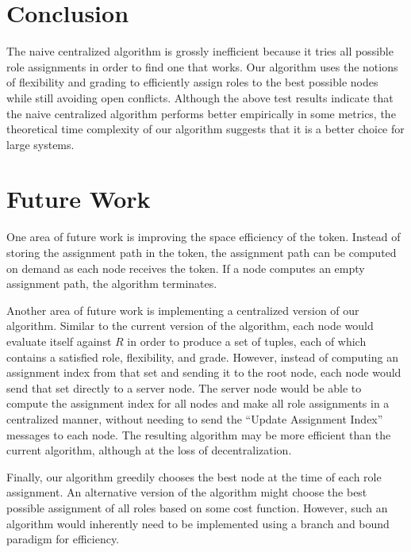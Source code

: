 \documentclass[11pt]{article}
\begin{document}
\begin{multicols}{2}
\section{Conclusion}
The naive centralized algorithm is grossly inefficient because it tries all possible role assignments in order to find one that works. Our algorithm uses the notions of flexibility and grading to efficiently assign roles to the best possible nodes while still avoiding open conflicts. Although the above test results indicate that the naive centralized algorithm performs better empirically in some metrics, the theoretical time complexity of our algorithm suggests that it is a better choice for large systems.

\section{Future Work}
One area of future work is improving the space efficiency of the token. Instead of storing the assignment path in the token, the assignment path can be computed on demand as each node receives the token. If a node computes an empty assignment path, the algorithm terminates.

Another area of future work is implementing a centralized version of our algorithm. Similar to the current version of the algorithm, each node would evaluate itself against $R$ in order to produce a set of tuples, each of which contains a satisfied role, flexibility, and grade. However, instead of computing an assignment index from that set and sending it to the root node, each node would send that set directly to a server node. The server node would be able to compute the assignment index for all nodes and make all role assignments in a centralized manner, without needing to send the ``Update Assignment Index'' messages to each node. The resulting algorithm may be more efficient than the current algorithm, although at the loss of decentralization.

Finally, our algorithm greedily chooses the best node at the time of each role assignment. An alternative version of the algorithm might choose the best possible assignment of all roles based on some cost function. However, such an algorithm would inherently need to be implemented using a branch and bound paradigm for efficiency.

\end{multicols}
\end{document}
